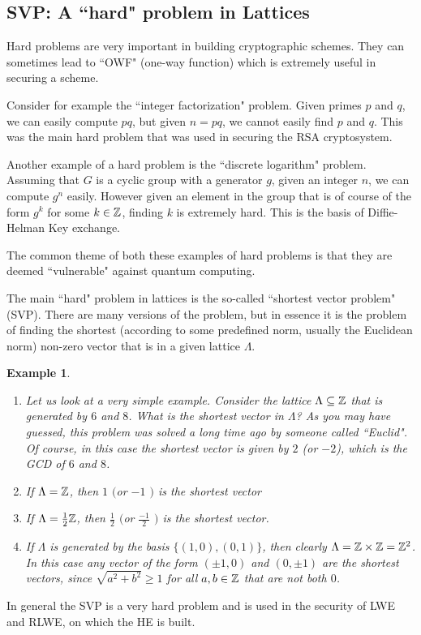 \documentclass[12pt]{article}
\theoremstyle{plain}
\newtheorem{example}{Example}
\theoremstyle{definition}
\theoremstyle{remark}
\begin{document}
\subsection{SVP: A ``hard" problem in Lattices}
Hard problems are very important in building cryptographic schemes. They can sometimes lead to ``OWF" (one-way function) which is extremely useful in securing a scheme. 

Consider for example the ``integer factorization" problem. Given primes $p$ and $q$, we can easily compute $pq$, but given $n=pq$, we cannot easily find $p$ and $q$. This was the main hard problem that was used in securing the RSA cryptosystem. 

Another example of a hard problem is the ``discrete logarithm" problem. Assuming that $G$ is a cyclic group with a generator $g$, given an integer $n$, we can compute $g^n$ easily. However given an element in the group that is of course of the form $g^k$ for some $k\in \mathbb{Z}$, finding $k$ is extremely hard. This is the basis of Diffie-Helman Key exchange. 

The common theme of both these examples of hard problems is that they are deemed ``vulnerable" against quantum computing. 

The main ``hard" problem in lattices is the so-called ``shortest vector problem" (SVP). There are many versions of the problem, but in essence it is the problem of finding the shortest (according to some predefined norm, usually the Euclidean norm) non-zero vector that is in a given lattice $\Lambda$. 
\begin{example}
\begin{enumerate}
    \item Let us look at a very simple example. Consider the lattice $\Lambda \subseteq \mathbb{Z}$ that is generated by $6$ and $8$. What is the shortest vector in $\Lambda$? As you may have guessed, this problem was solved a long time ago by someone called ``Euclid". Of course, in this case the shortest vector is given by $2$ (or $-2$), which is the GCD of $6$ and $8$. 
  \item If $\Lambda=\mathbb{Z}$, then $1$ $($or $-1$ $)$ is the shortest vector
  \item If $\Lambda = \frac{1}{2}\mathbb{Z}$, then $\frac{1}{2}$ $($or $\frac{-1}{2}$ $)$ is the shortest vector. 
\item If $\Lambda$ is generated by the basis $\{(1,0), (0,1)\}$, then clearly $\Lambda = \mathbb{Z}\times \mathbb{Z}=\mathbb{Z}^2$. In this case any vector of the form 
$(\pm 1,0)$ and $(0,\pm 1)$ are the shortest vectors, since $\sqrt{a^2+b^2}\geq 1$ for all $a, b\in \mathbb{Z}$ that are not both $0$. 
\end{enumerate}
\end{example}
In general the SVP is a very hard problem and is used in the security of LWE and RLWE, on which the HE is built. 
\end{document}
